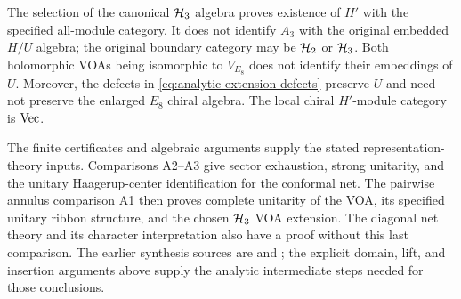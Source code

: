 \begin{remark}
\label{rem:analytic-extension-scope}
The selection of the canonical $\HH_3$ algebra proves existence of
$H'$ with the specified all-module category.  It does not identify
$A_3$ with the original embedded $H/U$ algebra; the original boundary
category may be $\HH_2$ or $\HH_3$.  Both holomorphic VOAs being
isomorphic to $V_{E_8}$ does not identify their embeddings of $U$.
Moreover, the defects in \eqref{eq:analytic-extension-defects} preserve
$U$ and need not preserve the enlarged $E_8$ chiral algebra.
The local chiral $H'$-module category is $\Vec$.
\end{remark}

The finite certificates and algebraic arguments supply the stated
representation-theory inputs.  Comparisons A2--A3 give sector
exhaustion, strong unitarity, and the unitary Haagerup-center
identification for the conformal net.  The pairwise annulus comparison
A1 then proves complete unitarity of the VOA, its specified unitary
ribbon structure, and the chosen $\HH_3$ VOA extension.  The diagonal
net theory and its character interpretation also have a proof without
this last comparison.  The earlier synthesis sources are
 and
; the explicit
domain, lift, and insertion arguments above supply the analytic
intermediate steps needed for those conclusions.
